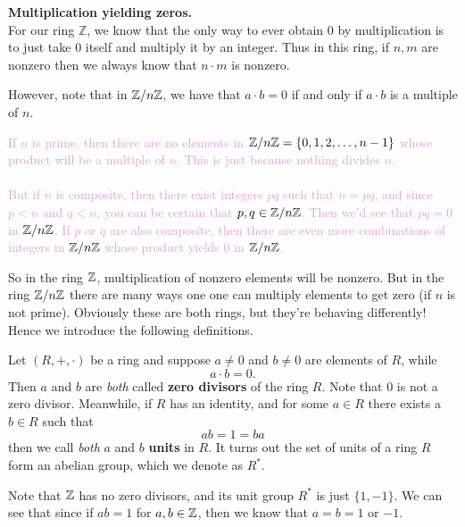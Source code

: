     \noindent\textbf{Multiplication yielding zeros.}\\
    For our ring $\mathbb{Z}$, we know that the only way to ever
    obtain $0$ by multiplication is to just take $0$ itself and multiply
    it by an integer. Thus in this ring, if $n, m$ are nonzero
    then we always know that $n \cdot m$ is nonzero.
    
    However, note that in $\mathbb{Z}/n\mathbb{Z}$, we have
    that $a \cdot b = 0$ if and only if $a \cdot b$ is a multiple
    of $n$.

    \textcolor{Plum}{If $n$ is prime, then there are no elements
    in $\mathbb{Z}/n\mathbb{Z} = \{0, 1, 2, \dots, n-1\}$ whose product will be
    a multiple of $n$. This is just because nothing divides $n$.
    \\
    \\
    But if $n$ is composite, then there exist
    integers $pq$ such that $n = pq$, and since $p < n$ and $q <
    n$, you can be certain that $p, q \in \mathbb{Z}/n\mathbb{Z}$. Then we'd see
    that $pq = 0$ in $\mathbb{Z}/n\mathbb{Z}$. If $p$ or $q$ are also composite, then
    there are even more combinations of integers in $\mathbb{Z}/n\mathbb{Z}$
    whose product yields 0 in $\mathbb{Z}/n\mathbb{Z}$. 
    }

    So in the ring $\mathbb{Z}$, multiplication of nonzero elements will
    be nonzero. But in the ring $\mathbb{Z}/n\mathbb{Z}$ there are many ways one
    one can multiply elements to get zero (if $n$ is not prime).
    Obviously these are both rings, but they're behaving
    differently! Hence we introduce the following definitions. 

    \begin{definition}
        Let $(R, +, \cdot)$ be a ring and suppose $a \ne 0$ and $b
        \ne 0$ are elements of $R$,
        while 
        \[
            a \cdot b = 0.
        \]
        Then $a$ and $b$ are \textit{both} called
        \textbf{zero divisors} of the ring ${R}$. Note that $0$ is
        not a zero divisor.
        Meanwhile, if $R$ has an identity, and for some $a \in R$
        there exists a $b \in R$ such that 
        \[
            ab = 1 = ba
        \]
        then we call \textit{both} $a$ and $b$ \textbf{units} in $R$.
        It turns out the set of units of a ring $R$ form an
        abelian group, which we denote as $R^*$.
    \end{definition}

    Note that $\mathbb{Z}$ has no zero divisors, and its unit group $R^*$
    is just $\{1, -1\}$. We can see that since if $ab = 1$ for $a, b \in \mathbb{Z}$, then we
    know that $a = b = 1$ or $-1$.

